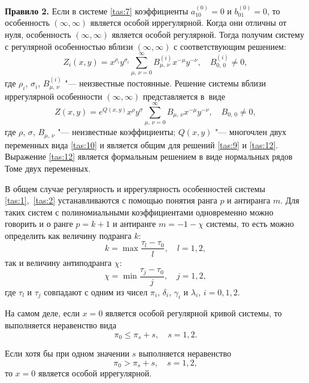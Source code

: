 \textbf {Правило 2.} Если в системе \eqref{tas:7} коэффициенты $a_{10}^{(0)}=0$ и $b_{01}^{(0)}=0$, то особенность $(\infty,\infty)$ является особой иррегулярной. 
Когда они отличны от нуля, особенность $(\infty, \infty)$ является особой регулярной.
Тогда получим систему с регулярной особенностью вблизи $(\infty, \infty)$ с соответствующим решением:
\begin{equation}
Z_{i}(x,y)=x^{\rho_{i}}   y^{\sigma_{i}}    
\sum_{\mu,\,\nu=0}^\infty B_{\mu,\,\nu}^{(i)}   x^{-\mu}  
y^{-\nu}, \quad B_{0,\,0}^{(i)}\neq 0,
\label{tas:11}
\end{equation}
где
$\rho_{i}$, $\sigma_{i}$, $B_{\mu,\,\nu}^{(i)}$ "--- неизвестные постоянные. 
Решение системы вблизи иррегулярной особенности $(\infty,\infty)$ представляется в~виде
\begin{equation}
Z(x,y)=e^{Q(x,y)}   x^{\rho}   y^{\sigma}  \sum_{\mu,\,\nu=0}^\infty B_{\mu,\,\nu}  
x^{-\mu}   y^{-\nu}, \quad B_{0,\,0}\neq 0, 
\label{tas:12}
\end{equation}
где
$\rho$, $\sigma$, $B_{\mu,\,\nu}$ "--- неизвестные коэффициенты; 
$Q(x,y)$ "--- многочлен двух переменных вида \eqref{tas:10} и является общим для решений \eqref{tas:9} и \eqref{tas:12}. 
Выражение \eqref{tas:12} является формальным решением в виде нормальных рядов Томе двух переменных.

В общем случае регулярность и иррегулярность особенностей системы
\eqref{tas:1},~\eqref{tas:2} устанавливаются  с помощью понятия ранга $p$ и антиранга
$m$. Для таких систем с полиномиальными коэффициентами
одновременно можно говорить и о ранге $p=k+1$ и антиранге
$m=-1-\chi$ системы, то есть можно определить как величину
подранга $k$:
\begin{equation}
k=\max\frac{\tau_{l}-\tau_{0}}{l}, \quad l=1, 2,
\label{tas:13}
\end{equation}
так и величину антиподранга $\chi$:
\begin{equation}
\chi=\min\frac{\tau_{j}-\tau_{0}}{j}, \quad j=1, 2,
\label{tas:14}
\end{equation}
где $\tau_{l}$ и $\tau_{j}$ совпадают с одним из чисел $\pi_{i}$, $\delta_{i}$, $\gamma_{i}$ и $\lambda_{i}$, $i=0, 1, 2$.

На самом деле, если $x=0$ является особой регулярной кривой
системы, то выполняется неравенство вида
\begin{equation}
\pi_{0}\leq \pi_{s}+s, \quad s =1, 2.
\label{tas:15}
\end{equation}

Если хотя бы при одном значении $s$ выполняется неравенство 
$$\pi_{0}> \pi_{s}+s, \quad   s =1, 2,$$ 
то $x=0$ является особой иррегулярной.

